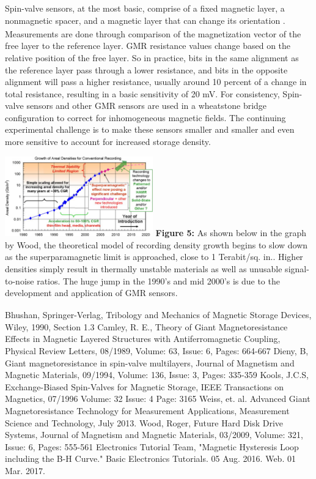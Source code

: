 \documentclass[11pt]{article}
\begin{document}
\begin{multicols}{2}
Spin-valve sensors, at the most basic, comprise of a fixed magnetic layer, a nonmagnetic spacer, and a magnetic layer that can change its orientation\textsubscript{ \cite{label3}}. Measurements  are done through comparison of the magnetization vector of the free layer to the reference layer. GMR resistance values change based on the relative position of the free layer. So in practice, bits in the same alignment as the reference layer pass through a lower resistance, and bits in the opposite alignment will pass a higher resistance, usually around 10 percent of a change in total resistance, resulting in a basic sensitivity of 20 mV. For consistency, Spin-valve sensors and other GMR sensors are used in a wheatstone bridge configuration to correct for inhomogeneous magnetic fields. The continuing experimental challenge is to make these sensors smaller and smaller and even more sensitive to account for increased storage density.

\begin{center}
	\centering
	\includegraphics[width=0.48\textwidth]{region_of_stability.png}
	{\footnotesize\textbf{Figure 5:} As shown below in the graph by Wood, the theoretical model of recording density growth begins to slow down as the superparamagnetic limit is approached, close to 1 Terabit/sq. in.. Higher densities simply result in thermally unstable materials as well as unusable signal-to-noise ratios. The huge jump in the 1990’s and mid 2000’s is due to the development and application of GMR sensors.\textsubscript{\cite{label6}}} 
\end{center} 



\begin{thebibliography}{9}
	{\footnotesize
	 Bhushan, Springer-Verlag, Tribology and Mechanics of Magnetic Storage Devices, Wiley, 1990, Section 1.3 
	 Camley, R. E., Theory of Giant Magnetoresistance Effects in Magnetic Layered Structures with Antiferromagnetic Coupling, Physical Review Letters, 08/1989, Volume: 63, Issue: 6, Pages: 664-667
	 Dieny, B, Giant magnetoresistance in spin-valve multilayers, Journal of Magnetism and Magnetic Materials, 09/1994, Volume: 136, Issue: 3, Pages: 335-359
	 Kools, J.C.S, Exchange-Biased Spin-Valves for Magnetic Storage, IEEE Transactions on Magnetics, 07/1996 Volume: 32 Issue: 4 Page: 3165
	Weiss, et. al. Advanced Giant Magnetoresistance Technology for Measurement Applications, Measurement Science and Technology, July 2013.  
	 Wood, Roger, Future Hard Disk Drive Systems, Journal of Magnetism and Magnetic Materials, 03/2009, Volume: 321, Issue: 6, Pages: 555-561
	 Electronics Tutorial Team, "Magnetic Hysteresis Loop including the B-H Curve." Basic Electronics Tutorials. 05 Aug. 2016. Web. 01 Mar. 2017.
	
}
\end{thebibliography}
\end{multicols}
\end{document}
